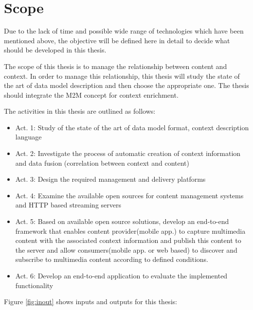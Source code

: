 \section{Scope\label{sec:scope}}

Due to the lack of time and possible wide range of technologies which have been mentioned above, the objective will be defined here in detail to decide what should be developed in this thesis.

The scope of this thesis is to manage the relationship between content and context. In order to manage this relationship, this thesis will study the state of the art of data model description and then choose the appropriate one. The thesis should integrate the \ac{M2M} concept for context enrichment.


The activities in this thesis are outlined as follows:
	\begin{itemize}
		\item Act. 1: Study of the state of the art of data model format, context description language
				\vspace{-0.1in} 
		\item Act. 2: Investigate the process of automatic creation of context information and data fusion (correlation between context and content)
				\vspace{-0.1in} 		
		\item Act. 3: Design the required management and delivery platforms 
    			\vspace{-0.1in} 
		\item Act. 4: Examine the available open sources for content management systems and \ac{HTTP} based streaming servers
 				\vspace{-0.1in} 
		\item Act. 5: Based on available open source solutions, develop an end-to-end framework that enables content provider(mobile app.) to capture multimedia content with the associated context information and publish this content to the server and allow consumers(mobile app. or web based) to discover and subscribe to multimedia content according to defined conditions. 
    			\vspace{-0.1in} 
    	\item Act. 6: Develop an end-to-end application to evaluate the implemented functionality
    \end{itemize}

\pagebreak

Figure \ref{fig:inout} shows inputs and outputs for this thesis:

